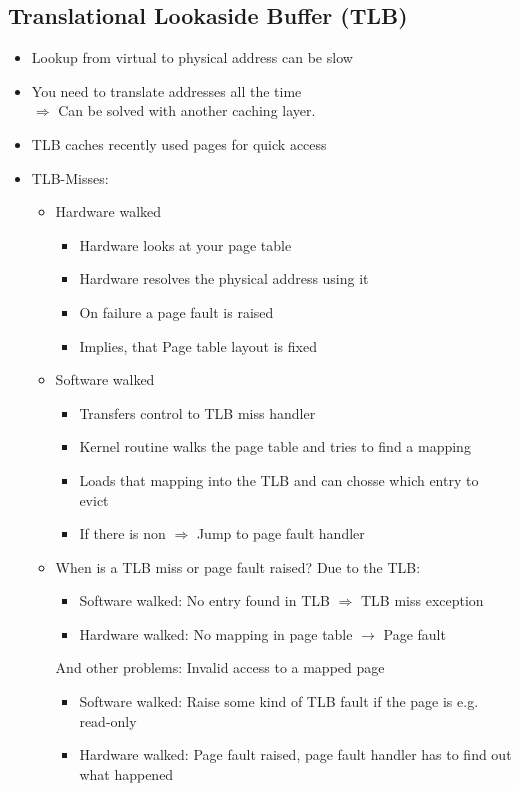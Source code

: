 \documentclass{kit}
\begin{document}
  \subsection{Translational Lookaside Buffer (TLB)}
    \begin{itemize}
      \item Lookup from virtual to physical address can be slow
      \item You need to translate addresses all the time\\
        $\Rightarrow$ Can be solved with another caching layer.
      \item TLB caches recently used pages for quick access
      \item TLB-Misses:
        \begin{itemize}
          \item Hardware walked
            \begin{itemize}
              \item Hardware looks at your page table
              \item Hardware resolves the physical address using it
              \item On failure a page fault is raised
              \item Implies, that Page table layout is fixed
            \end{itemize}
          \item Software walked
            \begin{itemize}
              \item Transfers control to TLB miss handler
              \item Kernel routine walks the page table and tries to find a mapping
              \item Loads that mapping into the TLB and can chosse which entry to evict
              \item If there is non $\Rightarrow$ Jump to page fault handler
            \end{itemize}
          \item When is a TLB miss or page fault raised?
            Due to the TLB:
            \begin{itemize}
              \item Software walked: No entry found in TLB $\Rightarrow$ TLB miss exception
              \item Hardware walked: No mapping in page table $\rightarrow$ Page fault
            \end{itemize}
            And other problems: Invalid access to a mapped page
            \begin{itemize}
              \item Software walked: Raise some kind of TLB fault if the page is e.g. read-only
              \item Hardware walked: Page fault raised, page fault handler has to find out what happened
            \end{itemize}
        \end{itemize}
    \end{itemize}
\end{document}
